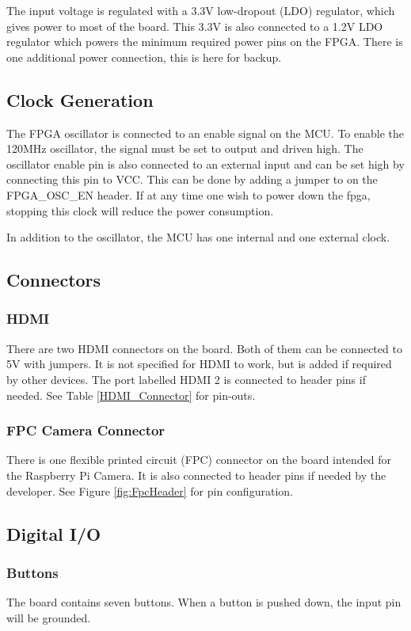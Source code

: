 The input voltage is regulated with a 3.3V low-dropout (LDO) regulator, which gives power to most of the board.
This 3.3V is also connected to a 1.2V LDO regulator which powers the minimum required power pins on the FPGA. There is one additional power connection, this is here for backup.

\subsection{Clock Generation}
The FPGA oscillator is connected to an enable signal on the MCU.
To enable the 120MHz oscillator, the signal must be set to output and driven high.
The oscillator enable pin is also connected to an external input and can be set high by connecting this pin to VCC.
This can be done by adding a jumper to on the FPGA\_OSC\_EN header. If at any time one wish to power down the fpga, stopping this clock will reduce the power consumption.

In addition to the oscillator, the MCU has one internal and one external clock.

\subsection{Connectors}
\subsubsection{HDMI}
There are two HDMI connectors on the board.
Both of them can be connected to 5V with jumpers. It is not specified for HDMI to work, but is added if required by other devices.
The port labelled HDMI 2 is connected to header pins if needed.
See Table \ref{HDMI_Connector} for pin-outs.

\subsubsection{FPC Camera Connector}
There is one flexible printed circuit (FPC) connector on the board intended for the Raspberry Pi Camera.
It is also connected to header pins if needed by the developer.
See Figure \ref{fig:FpcHeader} for pin configuration.

\subsection{Digital I/O}
\subsubsection{Buttons}
The board contains seven buttons.
When a button is pushed down, the input pin will be grounded.

